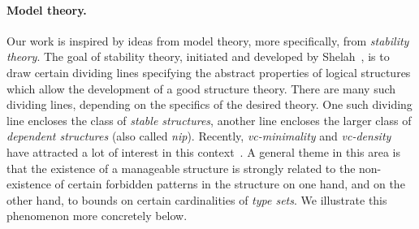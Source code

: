 %
%
%
%
%
%




\paragraph{Model theory.}Our work is inspired by ideas from model theory,  more specifically, from \emph{stability theory}.
%
  The goal of {stability theory},
  initiated and developed by Shelah~\cite{shelah1990classification},
  is to draw certain dividing lines
  specifying  the abstract properties of 
  logical structures which allow the development 
  of a good structure theory. There are many such dividing lines, depending on the specifics of the desired theory. One such dividing line encloses the class of \emph{stable structures}, another line encloses the larger class of \emph{dependent structures} (also called \emph{nip}). Recently, \emph{vc-minimality} and \emph{vc-density} have attracted a lot of interest in this context~\cite{}. 
  A general theme in this area is that the existence of a manageable structure is strongly related to
  the non-existence of certain forbidden patterns in the structure on one hand,
and on the other hand, to bounds on certain cardinalities
of \emph{type sets}.  
  We illustrate this phenomenon more concretely below.

